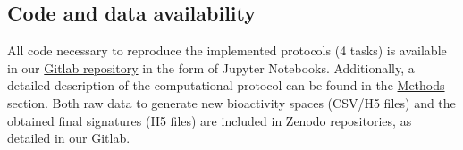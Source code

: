 \subsection{Code and data availability}
\label{Protocols_Code}

All code necessary to reproduce the implemented protocols (4 tasks) is available in our \href{https://gitlabsbnb.irbbarcelona.org/packages/protocols}{Gitlab repository} in the form of Jupyter Notebooks. Additionally, a detailed description of the computational protocol can be found in the \hyperref[Protocols_Methods]{Methods} section. Both raw data to generate new bioactivity spaces (CSV/H5 files) and the obtained final signatures (H5 files) are included in Zenodo repositories, as detailed in our Gitlab. 

